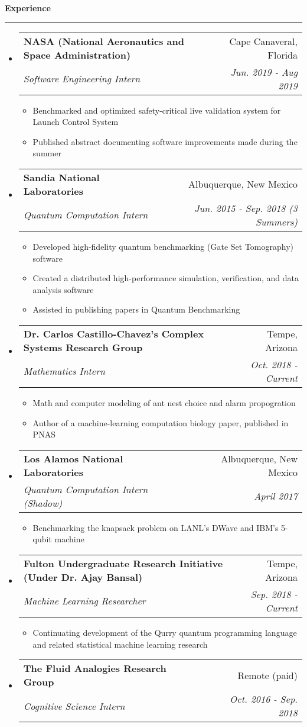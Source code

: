\documentclass[letterpaper,11pt]{article}
\makeatletter
\newcommand{\sectionline}{
    \noindent\rule[0.5ex]{\linewidth}{0.5pt}
}
\newcommand{\resitem}[1]{\item #1 \vspace{-3pt}}
\newcommand{\resheading}[1]{
    {\large \textbf{#1}}
    \sectionline
}
\newcommand{\colfill}{@{\extracolsep{\fill}}}
\newcommand{\ressubheading}[4]{
\begin{tabular*}{6.5in}{l\colfill r}
		\textbf{#1} & #2 \\
		\textit{#3} & \textit{#4} \\
\end{tabular*}\vspace{-6pt}}
\makeatother
\begin{document}
\resheading{Experience}
\begin{itemize}
 \item
     \ressubheading{NASA (National Aeronautics and Space Administration)}{Cape Canaveral, Florida}{Software Engineering Intern}{Jun. 2019 - Aug 2019}
 	\begin{itemize}
        \resitem{Benchmarked and optimized safety-critical live validation system for Launch Control System}
 		\resitem{Published abstract documenting software improvements made during the summer}
 	\end{itemize}
 \item
     \ressubheading{Sandia National Laboratories}{Albuquerque, New Mexico}{Quantum Computation Intern}{Jun. 2015 - Sep. 2018 (3 Summers)}
 	\begin{itemize}
        \resitem{Developed high-fidelity quantum benchmarking (Gate Set Tomography) software}
 		\resitem{Created a distributed high-performance simulation, verification, and data analysis software}
 		\resitem{Assisted in publishing papers in Quantum Benchmarking}
 	\end{itemize}
 \item
     \ressubheading{Dr. Carlos Castillo-Chavez's Complex Systems Research Group}{Tempe, Arizona}{Mathematics Intern}{Oct. 2018 - Current}
 	\begin{itemize}
 		\resitem{Math and computer modeling of ant nest choice and alarm propogration}
        \resitem{Author of a machine-learning computation biology paper, published in PNAS}
 	\end{itemize}
 \item
     \ressubheading{Los Alamos National Laboratories}{Albuquerque, New Mexico}{Quantum Computation Intern (Shadow)}{April 2017}
 	\begin{itemize}
 		\resitem{Benchmarking the knapsack problem on LANL's DWave and IBM's 5-qubit machine}
 	\end{itemize}
 \item
     \ressubheading{Fulton Undergraduate Research Initiative (Under Dr. Ajay Bansal)}{Tempe, Arizona}{Machine Learning Researcher}{Sep. 2018 - Current}
 	\begin{itemize}
        \resitem{Continuating development of the Qurry quantum programming language and related statistical machine learning research}
 	\end{itemize}
 \item
     \ressubheading{The Fluid Analogies Research Group}{Remote (paid)}{Cognitive Science Intern}{Oct. 2016 - Sep. 2018}

\end{itemize}
\end{document}
